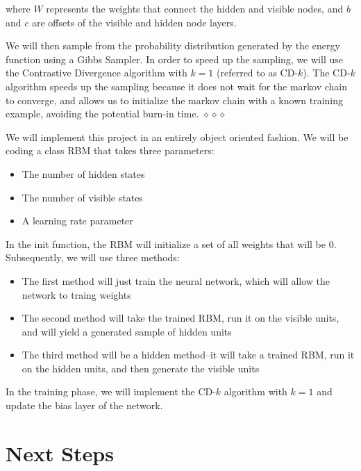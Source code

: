 \documentclass[12pt]{article}
\begin{document}
where $W$ represents the weights that connect the hidden and visible nodes, and $b$ and $c$ are offsets of the visible and hidden node layers. 

We will then sample from the probability distribution generated by the energy function using a Gibbs Sampler. In order to speed up the sampling, we will use the Contrastive Divergence algorithm with $k=1$ (referred to as CD-$k$). The CD-$k$ algorithm speeds up the sampling because it does not wait for the markov chain to converge, and allows us to initialize the markov chain with a known training example, avoiding the potential burn-in time. $\diamond \diamond \diamond$

We will implement this project in an entirely object oriented fashion. We will be coding a class RBM that takes three parameters:
\begin{itemize}
  \item The number of hidden states
  \item The number of visible states
  \item A learning rate parameter
\end{itemize}

In the init function, the RBM will initialize a set of all weights that will be 0. Subsequently, we will use three methods:
\begin{itemize}
  \item The first method will just train the neural network, which will allow the network to traing weights
  \item The second method will take the trained RBM, run it on the visible units, and will yield a generated sample of hidden units
  \item The third method will be a hidden method--it will take a trained RBM, run it on the hidden units, and then generate the visible units
\end{itemize}

In the training phase, we will implement the CD-$k$ algorithm with $k = 1$ and update the bias layer of the network.


\section{Next Steps}
\end{document}
